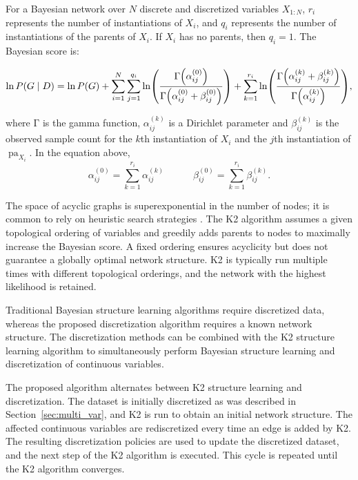 \documentclass[twoside,11pt]{article}
\newcommand{\citep}[1]{\cite{#1}}
\newcommand{\paren}[1]{\mathopen{}\mathclose\bgroup\left(#1\aftergroup\egroup\right)}
\DeclareMathOperator{\Pa}{pa} %
\begin{document}
For a Bayesian network over $N$ discrete and discretized variables $X_{1:N}$, $r_i$ represents the number of instantiations of $X_i$, and $q_i$ represents the number of instantiations of the parents of $X_i$.
If $X_i$ has no parents, then $q_i = 1$.
The Bayesian score is:
\begin{small}
\begin{equation}
\label{eq:BayesianScore}
  \ln P(G\mid D) = \ln P(G) + \sum_{i=1}^N \sum_{j=1}^{q_i} \ln \paren{
    \frac{
      \mathrm{\Gamma}\paren{\alpha_{ij}^{(0)}}
    }{
      \mathrm{\Gamma}\paren{\alpha_{ij}^{(0)} + \beta_{ij}^{(0)}}
    }
  } + \sum_{k=1}^{r_i} \ln \paren{
    \frac{
      \mathrm{\Gamma}\paren{\alpha_{ij}^{(k)} + \beta_{ij}^{(k)}}
    }{
      \mathrm{\Gamma}\paren{\alpha_{ij}^{(k)}}
    }
  }\text{,}
\end{equation}
\end{small}
where $\mathrm{\Gamma}$ is the gamma function, $\alpha_{ij}^{(k)}$ is a Dirichlet parameter and $\beta_{ij}^{(k)}$ is the observed sample count for the $k$th instantiation of $X_i$ and the $j$th instantiation of $\Pa_{X_i}$.
In the equation above,
\begin{equation}
\alpha_{ij}^{(0)} = \sum_{k=1}^{r_i} \alpha_{ij}^{(k)} \quad \qquad \beta_{ij}^{(0)} = \sum_{k=1}^{r_i} \beta_{ij}^{(k)}\text{.}
\end{equation}

The space of acyclic graphs is superexponential in the number of nodes; it is common to rely on heuristic search strategies \citep{PGM_2009}.
The K2 algorithm assumes a given topological ordering of variables and greedily adds parents to nodes to maximally increase the Bayesian score.
A fixed ordering ensures acyclicity but does not guarantee a globally optimal network structure.
K2 is typically run multiple times with different topological orderings, and the network with the highest likelihood is retained.

Traditional Bayesian structure learning algorithms require discretized data, whereas the proposed discretization algorithm requires a known network structure.
The discretization methods can be combined with the K2 structure learning algorithm \citep{cooper1992bayesian} to simultaneously perform Bayesian structure learning and discretization of continuous variables.

The proposed algorithm alternates between K2 structure learning and discretization.
The dataset is initially discretized as was described in Section~\ref{sec:multi_var}, and K2 is run to obtain an initial network structure.
The affected continuous variables are rediscretized every time an edge is added by K2.
The resulting discretization policies are used to update the discretized dataset, and the next step of the K2 algorithm is executed.
This cycle is repeated until the K2 algorithm converges.
\end{document}

